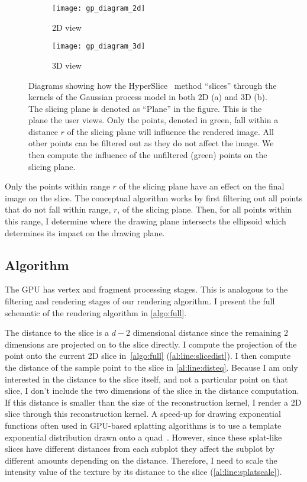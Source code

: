 \begin{figure}[htb]
  \centering
  \begin{subfigure}{0.25\textwidth}
    \centering
    \texttt{[image: gp\_diagram\_2d]}
    \caption{2D view}
    \label{fig:hs_2d}
  \end{subfigure}%
  \begin{subfigure}{0.25\textwidth}
    \centering
    \texttt{[image: gp\_diagram\_3d]}
    \caption{3D view}
    \label{fig:hs_3d}
  \end{subfigure}
  \caption[Example of 2D slices of 2D and 3D spheres]{
    Diagrams showing how the HyperSlice~\cite{Wijk:1993} method ``slices'' 
    through the 
    kernels of the Gaussian process model in both 2D (a) and 3D (b).  The 
    slicing plane is denoted as ``Plane'' in the figure.  This is the 
    plane the user views.  Only the points, denoted in green, fall within a 
    distance $r$ of the slicing
    plane will influence the rendered image.  All other points can be filtered
    out as they do not affect the image.  We then compute the influence of 
    the unfiltered (green) points on the slicing plane.
  }
  \label{fig:hyperslice_geometry}
\end{figure}


Only the points within range $r$ of the slicing plane have an effect on the
final image on the slice.
The conceptual algorithm works by first filtering out all points
that do not fall within range, $r$, of the slicing plane.  Then, for all points
within this range, I determine where the drawing plane intersects the
ellipsoid which determines its impact on the drawing plane.

\subsection{Algorithm}

The GPU has vertex and fragment processing stages.  This is analogous
to the filtering and rendering stages of our rendering algorithm.
I present the full schematic of the rendering algorithm in \autoref{algo:full}.

The distance to the slice is a $d-2$ dimensional distance since the remaining
$2$ dimensions are projected on to the slice directly.
I compute the projection of the point onto the current 2D 
slice in~\autoref{algo:full} (\autoref{al:line:slicedist}).
I then compute the distance of the sample point to the slice in 
\autoref{al:line:disteq}.
Because I am only interested in the distance to the slice itself, and not
a particular point on that slice, I don't include the two dimensions
of the slice in the distance computation.  
If this distance is smaller
than the size of the reconstruction kernel, I render a
2D slice through this reconstruction kernel. 
A speed-up for drawing exponential functions often used
in GPU-based splatting algorithms is to use a template exponential distribution
drawn onto a quad~\cite{Mueller:1998}.
However, since these splat-like slices have different distances from each subplot they affect
the subplot by different amounts depending on the distance.  Therefore, I
need to scale the intensity
value of the texture by its distance to the 
slice (\autoref{al:line:splatscale}).

